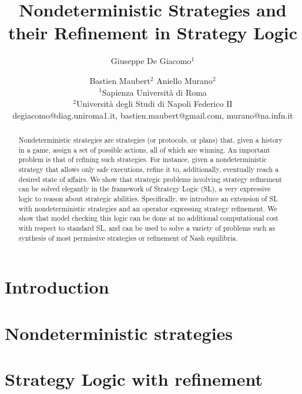 \documentclass{article}
\title{Nondeterministic Strategies and their Refinement in Strategy Logic}
\author{
 Giuseppe De Giacomo$^1$\and
 Bastien Maubert$^2$\And
  Aniello Murano$^2$\\
 	\affiliations
 	$^1$Sapienza Università di Roma\\
 	$^2$Universit\`a degli Studi di Napoli Federico II\\
 	\emails
 	degiacomo@diag.uniroma1.it,
 	bastien.maubert@gmail.com,
 	murano@na.infn.it
}
\theoremstyle{definition}
\theoremstyle{plain}
\begin{document}
\maketitle

\begin{abstract}
  Nondeterministic strategies are strategies (or protocols, or plans)
  that, given a history in a game, assign a set of possible actions,
  all of which are winning.  An important problem is that of refining
  such strategies. For instance, given a nondeterministic strategy
  that allows only safe executions, refine it to, additionally,
  eventually reach a desired state of affairs. We show that strategic
  problems involving strategy refinement can be solved elegantly in the framework of Strategy Logic
  (SL), a very expressive logic to reason about strategic
  abilities. Specifically, we introduce an extension of SL with
  nondeterministic strategies and an operator expressing  strategy refinement. We
  show that model checking this logic can be done at no additional
  computational cost with respect to standard SL, and can be used to
  solve a variety of problems such as  synthesis of most permissive
  strategies or
  refinement of Nash equilibria.
\end{abstract}

\section{Introduction}
\label{section:introduction}


\section{Nondeterministic strategies}
\label{section:refinement}






\section{Strategy Logic with refinement}
\label{section:SL}



% 
\end{document}
